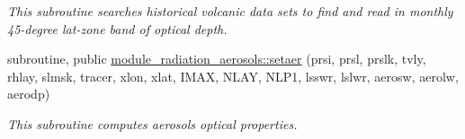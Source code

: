 \begin{DoxyCompactItemize}
\begin{DoxyCompactList}\small\item\em This subroutine searches historical volcanic data sets to find and read in monthly 45-\/degree lat-\/zone band of optical depth. \end{DoxyCompactList}\item 
subroutine, public \hyperlink{group__module__radiation__aerosols_ga184fcc0618c1c4d42fa08cfe1e20e5c1}{module\+\_\+radiation\+\_\+aerosols\+::setaer} (prsi, prsl, prslk, tvly, rhlay, slmsk, tracer, xlon, xlat, I\+M\+AX, N\+L\+AY, N\+L\+P1, lsswr, lslwr, aerosw, aerolw, aerodp)
\begin{DoxyCompactList}\small\item\em This subroutine computes aerosols optical properties. \end{DoxyCompactList}\end{DoxyCompactItemize}
